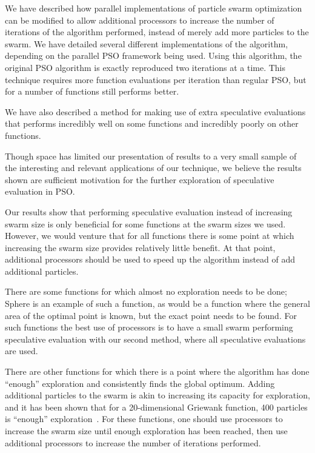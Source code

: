 \documentclass[conference,letterpaper]{IEEEtran}
\begin{document}
We have described how parallel implementations of particle swarm optimization
can be modified to allow additional processors to increase the number of
iterations of the algorithm performed, instead of merely add more particles to
the swarm.  We have detailed several different implementations of the
algorithm, depending on the parallel PSO framework being used.  Using this
algorithm, the original PSO algorithm is exactly reproduced two iterations at a
time.  This technique requires more function evaluations per iteration than
regular PSO, but for a number of functions still performs better.

We have also described a method for making use of extra speculative evaluations
that performs incredibly well on some functions and incredibly poorly on other
functions.

Though space has limited our presentation of results to a very small sample of
the interesting and relevant applications of our technique, we believe the
results shown are sufficient motivation for the further exploration of
speculative evaluation in PSO.

Our results show that performing speculative evaluation instead of increasing
swarm size is only beneficial for some functions at the swarm sizes we used.
However, we would venture that for all functions there is some point at which
increasing the swarm size provides relatively little benefit.  At that point,
additional processors should be used to speed up the algorithm instead of add
additional particles.

There are some functions for which almost no exploration needs to be done;
Sphere is an example of such a function, as would be a function where the
general area of the optimal point is known, but the exact point needs to be
found.  For such functions the best use of processors is to have a small swarm
performing speculative evaluation with our second method, where all speculative
evaluations are used.

There are other functions for which there is a point where the algorithm has
done ``enough'' exploration and consistently finds the global optimum.  Adding
additional particles to the swarm is akin to increasing its capacity for
exploration, and it has been shown that for a 20-dimensional Griewank function,
400 particles is ``enough'' exploration~\cite{mcnabb-cec09}.  For these
functions, one should use processors to increase the swarm size until enough
exploration has been reached, then use additional processors to increase the
number of iterations performed.
\end{document}
